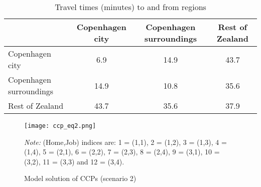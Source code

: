 \renewcommand{\arraystretch}{0.5}
\begin{table}[]
\centering
\caption{Travel times (minutes) to and from regions}
\label{tab:timedata}
\begin{tabular}{@{}l c c c @{}} 
\toprule
                    & Copenhagen city & Copenhagen surroundings & Rest of Zealand \\
\midrule
Copenhagen city         & 6.9        & 14.9               & 43.7     \\
Copenhagen surroundings & 14.9        & 10.8                & 35.6    \\
Rest of Zealand         & 43.7    & 35.6             & 37.9     \\ \bottomrule
\end{tabular}
\end{table}


\begin{figure}
\centering
\begin{minipage}{0.7\textwidth}
\texttt{[image: ccp\_eq2.png]} 
{\footnotesize \emph{Note:} (Home,Job) indices are: 1 = (1,1), 2 = (1,2), 3 = (1,3), 4 = (1,4), 5 = (2,1), 6 = (2,2), 7 = (2,3), 8 = (2,4), 9 = (3,1), 10 = (3,2), 11 = (3,3) and 12 = (3,4). \par}
\end{minipage}
\caption{Model solution of CCPs (scenario 2)}
\label{fig:sce2}
\end{figure}

